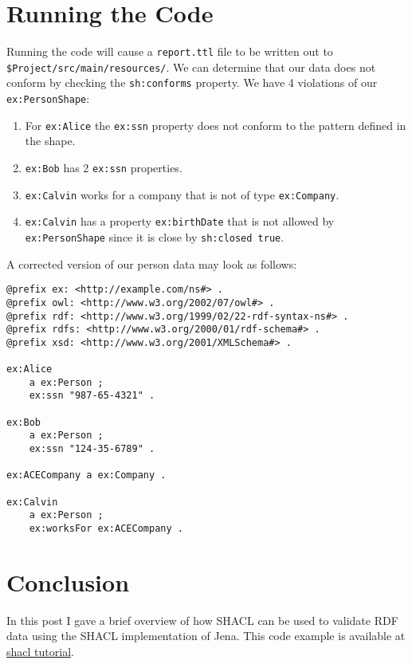 \documentclass{amsart}
\begin{document}
  \section{Running the Code}
  Running the code will cause a \texttt{report.ttl} file to be written out to \\\texttt{\$Project/src/main/resources/}. We can determine that our data does not conform by checking the \texttt{sh:conforms} property. We have 4 violations of our \texttt{ex:PersonShape}:
  \begin{enumerate}
   \item For \texttt{ex:Alice} the \texttt{ex:ssn} property does not conform to the pattern defined in the shape. 
   \item \texttt{ex:Bob} has 2 \texttt{ex:ssn} properties.
   \item \texttt{ex:Calvin} works for a company that is not of type \texttt{ex:Company}.
   \item \texttt{ex:Calvin} has a property \texttt{ex:birthDate} that is not allowed by \texttt{ex:PersonShape} since it is close by \texttt{sh:closed true}.
  \end{enumerate}

  A corrected version of our person data may look as follows:
  \begin{small}
  \begin{Verbatim} 
@prefix ex: <http://example.com/ns#> .
@prefix owl: <http://www.w3.org/2002/07/owl#> .
@prefix rdf: <http://www.w3.org/1999/02/22-rdf-syntax-ns#> .
@prefix rdfs: <http://www.w3.org/2000/01/rdf-schema#> .
@prefix xsd: <http://www.w3.org/2001/XMLSchema#> .

ex:Alice
	a ex:Person ;
	ex:ssn "987-65-4321" .
  
ex:Bob
	a ex:Person ;
	ex:ssn "124-35-6789" .

ex:ACECompany a ex:Company .

ex:Calvin
	a ex:Person ;
	ex:worksFor ex:ACECompany .    
  \end{Verbatim}
  \end{small}

  \section{Conclusion}
  In this post I gave a brief overview of how SHACL can be used to validate RDF data using the SHACL implementation of Jena. This code example is available at 
  \href{https://github.com/henrietteharmse/henrietteharmse/tree/master/blog/tutorial/jena/source/shacl}{shacl tutorial}.
  
  
  
  
  
  
  
 
\end{document}
